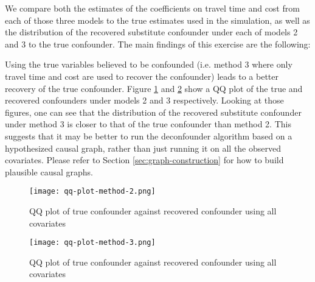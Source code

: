We compare both the estimates of the coefficients on travel time and cost from 
each of those three models to the true estimates used in the simulation, as well as the distribution of the recovered substitute confounder under each of 
models 2 and 3 to the true confounder. The main findings of this exercise are the following:


Using the true variables believed to be confounded (i.e. method 3 where only 
travel time and cost are used to recover the confounder) leads to a better 
recovery of the true confounder. Figure \ref{fig:qq-plot-method-2} and \ref{fig:qq-plot-method-3} show a QQ plot of the true 
and recovered confounders under models 2 and 3 respectively. Looking at those 
figures, one can see that the distribution of the recovered substitute 
confounder under method 3 is closer to that of the true confounder than method 
2. This suggests that it may be better to run the deconfounder algorithm based 
on a hypothesized causal graph, rather than just running it on all the 
observed covariates. Please refer to Section \ref{sec:graph-construction} for how to build plausible causal graphs. 


\begin{figure}
   \centering
   \texttt{[image: qq-plot-method-2.png]}
   \caption{QQ plot of true confounder against recovered confounder using all covariates}
   \label{fig:qq-plot-method-2}
\end{figure}

\begin{figure}
   \centering
   \texttt{[image: qq-plot-method-3.png]}
   \caption{QQ plot of true confounder against recovered confounder using all covariates}
   \label{fig:qq-plot-method-3}
\end{figure}



